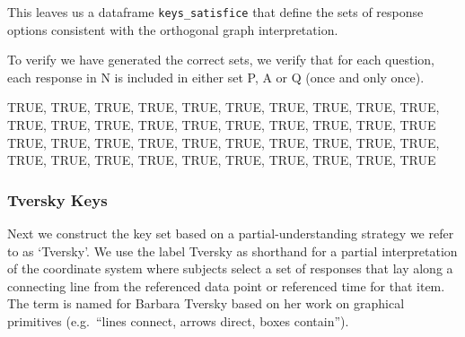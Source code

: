\documentclass[
  letterpaper,
  DIV=11,
  numbers=noendperiod]{scrreprt}
\begin{document}
This leaves us a dataframe \texttt{keys\_satisfice} that define the sets
of response options consistent with the orthogonal graph interpretation.

To verify we have generated the correct sets, we verify that for each
question, each response in N is included in either set P, A or Q (once
and only once).

TRUE, TRUE, TRUE, TRUE, TRUE, TRUE, TRUE, TRUE, TRUE, TRUE, TRUE, TRUE,
TRUE, TRUE, TRUE, TRUE, TRUE, TRUE, TRUE, TRUE TRUE, TRUE, TRUE, TRUE,
TRUE, TRUE, TRUE, TRUE, TRUE, TRUE, TRUE, TRUE, TRUE, TRUE, TRUE, TRUE,
TRUE, TRUE, TRUE, TRUE

\hypertarget{tversky-keys}{%
\subsubsection{Tversky Keys}\label{tversky-keys}}

Next we construct the key set based on a partial-understanding strategy
we refer to as `Tversky'. We use the label Tversky as shorthand for a
partial interpretation of the coordinate system where subjects select a
set of responses that lay along a connecting line from the referenced
data point or referenced time for that item. The term is named for
Barbara Tversky based on her work on graphical primitives (e.g.~``lines
connect, arrows direct, boxes contain'').
\end{document}
